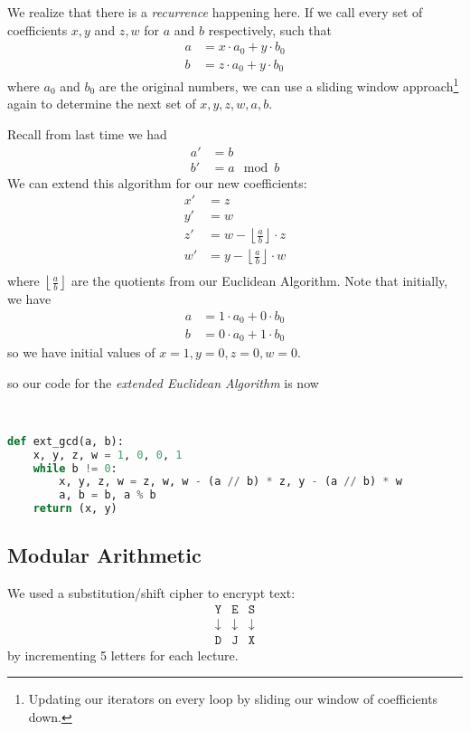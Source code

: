 We realize that there is a \emph{recurrence} happening here. If we call every set of coefficients $x, y$ and $z, w$ for $a$ and $b$ respectively, such that
\begin{align*}
    a & = x\cdot a_0 + y\cdot b_0 \\
    b & = z\cdot a_0 + y\cdot b_0
\end{align*}
where $a_0$ and $b_0$ are the original numbers, we can use a sliding window approach\footnote{Updating our iterators on every loop by sliding our window of coefficients down.} again to determine the next set of $x, y, z, w, a, b$.

Recall from last time we had
\begin{align*}
    a' & = b       \\
    b' & = a\mod b
\end{align*}
We can extend this algorithm for our new coefficients:
\begin{align*}
    x' & = z                                               \\
    y' & = w                                               \\
    z' & = w - \left\lfloor\frac{a}{b}\right\rfloor\cdot z \\
    w' & = y - \left\lfloor\frac{a}{b}\right\rfloor\cdot w \\
\end{align*}
where $\left\lfloor\frac{a}{b}\right\rfloor$ are the quotients from our Euclidean Algorithm. Note that initially, we have
\begin{align*}
    a & = 1\cdot a_0 + 0\cdot b_0 \\
    b & = 0\cdot a_0 + 1\cdot b_0
\end{align*}
so we have initial values of $x=1, y=0, z=0, w=0$.

so our code for the \emph{extended Euclidean Algorithm} is now
\begin{algorithm}
    ~\begin{lstlisting}[numbers=none,language=Python]
def ext_gcd(a, b):
    x, y, z, w = 1, 0, 0, 1
    while b != 0:
        x, y, z, w = z, w, w - (a // b) * z, y - (a // b) * w
        a, b = b, a % b
    return (x, y)
    \end{lstlisting}
\end{algorithm}

\subsection{Modular Arithmetic}
\recall We used a substitution/shift cipher to encrypt text:
\[\begin{array}{ccc}
        \mathtt{Y} & \mathtt{E} & \mathtt{S} \\
        \downarrow & \downarrow & \downarrow \\
        \mathtt{D} & \mathtt{J} & \mathtt{X}
    \end{array}\]
by incrementing 5 letters for each lecture.

